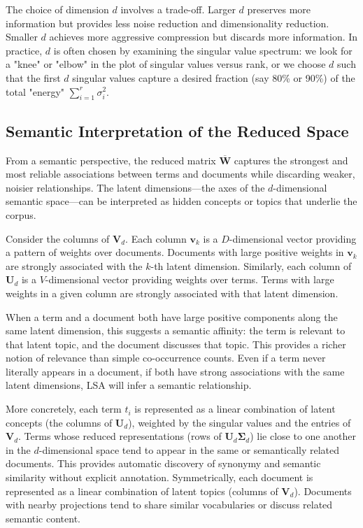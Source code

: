 The choice of dimension $d$ involves a trade-off. Larger $d$ preserves more information but provides less noise reduction and dimensionality reduction. Smaller $d$ achieves more aggressive compression but discards more information. In practice, $d$ is often chosen by examining the singular value spectrum: we look for a "knee" or "elbow" in the plot of singular values versus rank, or we choose $d$ such that the first $d$ singular values capture a desired fraction (say 80\% or 90\%) of the total "energy" $\sum_{i=1}^r \sigma_i^2$.

\subsection*{Semantic Interpretation of the Reduced Space}

From a semantic perspective, the reduced matrix $\overline{\mathbf{W}}$ captures the strongest and most reliable associations between terms and documents while discarding weaker, noisier relationships. The latent dimensions—the axes of the $d$-dimensional semantic space—can be interpreted as hidden concepts or topics that underlie the corpus.

Consider the columns of $\mathbf{V}_d$. Each column $\mathbf{v}_k$ is a $D$-dimensional vector providing a pattern of weights over documents. Documents with large positive weights in $\mathbf{v}_k$ are strongly associated with the $k$-th latent dimension. Similarly, each column of $\mathbf{U}_d$ is a $V$-dimensional vector providing weights over terms. Terms with large weights in a given column are strongly associated with that latent dimension.

When a term and a document both have large positive components along the same latent dimension, this suggests a semantic affinity: the term is relevant to that latent topic, and the document discusses that topic. This provides a richer notion of relevance than simple co-occurrence counts. Even if a term never literally appears in a document, if both have strong associations with the same latent dimensions, LSA will infer a semantic relationship.

More concretely, each term $t_i$ is represented as a linear combination of latent concepts (the columns of $\mathbf{U}_d$), weighted by the singular values and the entries of $\mathbf{V}_d$. Terms whose reduced representations (rows of $\mathbf{U}_d \boldsymbol{\Sigma}_d$) lie close to one another in the $d$-dimensional space tend to appear in the same or semantically related documents. This provides automatic discovery of synonymy and semantic similarity without explicit annotation. Symmetrically, each document is represented as a linear combination of latent topics (columns of $\mathbf{V}_d$). Documents with nearby projections tend to share similar vocabularies or discuss related semantic content.

